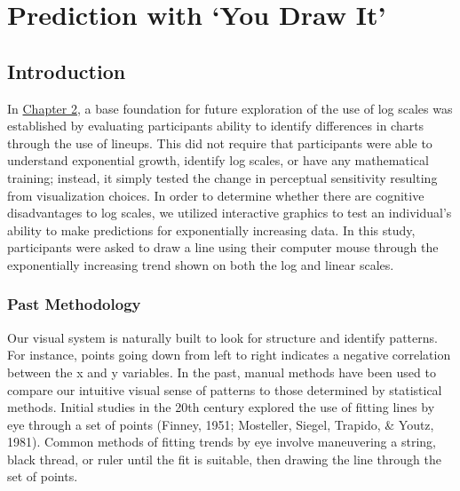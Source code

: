 \documentclass[print]{nuthesis}
\begin{document}
\hypertarget{youdrawit}{%
\chapter{Prediction with `You Draw It'}\label{youdrawit}}

\hypertarget{introduction-1}{%
\section{Introduction}\label{introduction-1}}

In \protect\hyperlink{lineups}{Chapter 2}, a base foundation for future exploration of the use of log scales was established by evaluating participants ability to identify differences in charts through the use of lineups.
This did not require that participants were able to understand exponential growth, identify log scales, or have any mathematical training; instead, it simply tested the change in perceptual sensitivity resulting from visualization choices.
In order to determine whether there are cognitive disadvantages to log scales, we utilized interactive graphics to test an individual's ability to make predictions for exponentially increasing data.
In this study, participants were asked to draw a line using their computer mouse through the exponentially increasing trend shown on both the log and linear scales.

\hypertarget{past-methodology}{%
\subsection{Past Methodology}\label{past-methodology}}

Our visual system is naturally built to look for structure and identify patterns.
For instance, points going down from left to right indicates a negative correlation between the x and y variables.
In the past, manual methods have been used to compare our intuitive visual sense of patterns to those determined by statistical methods.
Initial studies in the 20th century explored the use of fitting lines by eye through a set of points (Finney, 1951; Mosteller, Siegel, Trapido, \& Youtz, 1981).
Common methods of fitting trends by eye involve maneuvering a string, black thread, or ruler until the fit is suitable, then drawing the line through the set of points.
\end{document}
